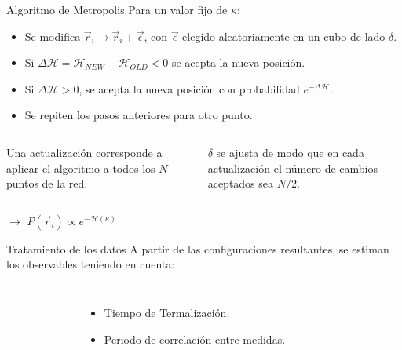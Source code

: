 \documentclass[xcolor=dvipsnames]{beamer}
\begin{document}
\begin{frame}{Algoritmo de Metropolis}
Para un valor fijo de $\kappa$:
\begin{itemize}
  \item  Se modifica $\vec{r}_i\rightarrow \vec{r}_i+\vec{\epsilon}$, con
    $\vec{\epsilon}$ elegido aleatoriamente en un cubo de lado $\delta$.
  \item  Si
    $\Delta\mathcal{H}=\mathcal{H}_{NEW}-\mathcal{H}_{OLD}<0$ se
    acepta la nueva posición. 
  \item Si  $\Delta\mathcal{H}>0$, se acepta la nueva posición con
    probabilidad $e^{-\Delta\mathcal{H}}$. 
  \item Se repiten los pasos anteriores para otro punto.
\end{itemize}
\begin{columns}[T]
    \begin{block}{}
      Una actualización corresponde a aplicar el
      algoritmo a todos los $N$ puntos de la red.
    \end{block}
    \begin{block}{}
      $\delta$ se ajusta de modo que en cada actualización el número de cambios
      aceptados sea $N/2$.
    \end{block}
\end{columns}

\begin{description}
\centering
\item[Configuraciones resultantes] $\rightarrow$ $P(\vec{r}_i)\propto e^{-\mathcal{H}(\kappa)}$
\end{description}
\end{frame}
\begin{frame}{Tratamiento de los datos}
A partir de las configuraciones resultantes, se estiman los observables teniendo en cuenta:
\begin{columns}
  \begin{figure}[h]
        \resizebox{\columnwidth}{!}{}
      \end{figure}
  \begin{itemize}
  \item Tiempo de Termalización.
  \item Periodo de correlación entre medidas.
  \end{itemize}
\end{columns}
\end{frame}
\end{document}
